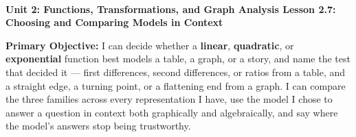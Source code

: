 \documentclass[10pt]{article}
\newcommand{\UnitNumberName}{Unit 2: Functions, Transformations, and Graph Analysis \quad}
\newcommand{\LessonNumberName}{Lesson 2.7: Choosing and Comparing Models in Context}
\begin{document}
\begin{center}
    {\Large\bfseries \CourseName \\
    {\small\bfseries \UnitNumberName \LessonNumberName}}
\end{center}

\begin{tcolorbox}[colback=mist, colframe=royal, boxrule=0.9pt, arc=2mm,
    left=2mm, right=2mm, top=1.5mm, bottom=1.5mm]
    \textbf{Primary Objective:} I can decide whether a \textbf{linear}, \textbf{quadratic}, or
    \textbf{exponential} function best models a table, a graph, or a story, and name the test that
    decided it --- first differences, second differences, or ratios from a table, and a straight edge,
    a turning point, or a flattening end from a graph. I can compare the three families across every
    representation I have, use the model I chose to answer a question in context both graphically and
    algebraically, and say where the model's answers stop being trustworthy.
\end{tcolorbox}
\end{document}
